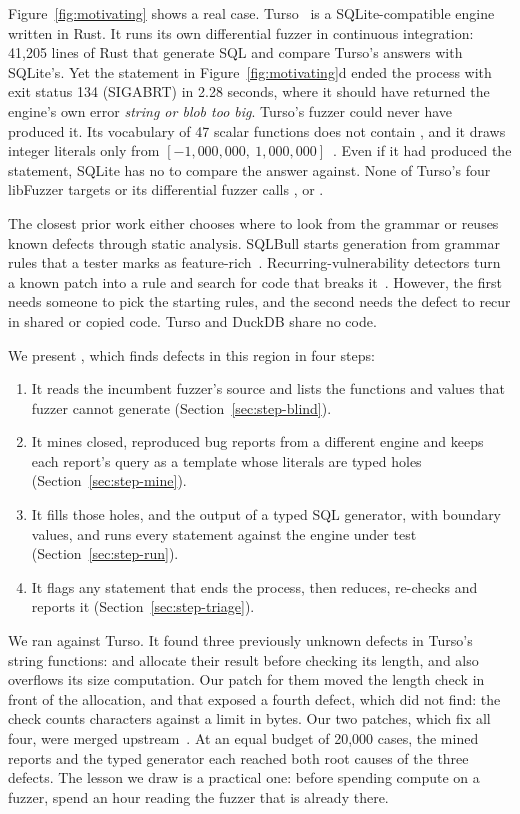 Figure~\ref{fig:motivating} shows a real case. Turso~\cite{turso} is a
SQLite-compatible engine written in Rust. It runs its own differential fuzzer in
continuous integration: 41{,}205 lines of Rust that generate SQL and compare
Turso's answers with SQLite's. Yet the statement in Figure~\ref{fig:motivating}d
ended the process with exit status 134 (SIGABRT) in 2.28 seconds, where it should
have returned the engine's own error \emph{string or blob too big}. Turso's
fuzzer could never have produced it. Its vocabulary of 47 scalar functions does
not contain , and it draws integer literals only from
$[-1{,}000{,}000,\ 1{,}000{,}000]$~\cite{tursofuzzer}. Even if it had produced
the statement, SQLite has no  to compare the answer against. None of
Turso's four libFuzzer targets or its differential fuzzer calls ,
 or .

The closest prior work either chooses where to look from the grammar or reuses
known defects through static analysis. SQLBull starts generation from grammar
rules that a tester marks as feature-rich~\cite{liang2026sqlbull}.
Recurring-vulnerability detectors turn a known patch into a rule and search for
code that breaks it~\cite{cao2025vulpa,cao2025antman}. However, the first needs
someone to pick the starting rules, and the second needs the defect to recur in
shared or copied code. Turso and DuckDB share no code.

We present \tool, which finds defects in this region in four steps:
\begin{enumerate}
  \item It reads the incumbent fuzzer's source and lists the functions and
        values that fuzzer cannot generate (Section~\ref{sec:step-blind}).
  \item It mines closed, reproduced bug reports from a different engine and keeps
        each report's query as a template whose literals are typed holes
        (Section~\ref{sec:step-mine}).
  \item It fills those holes, and the output of a typed SQL generator, with
        boundary values, and runs every statement against the engine under test
        (Section~\ref{sec:step-run}).
  \item It flags any statement that ends the process, then reduces, re-checks and
        reports it (Section~\ref{sec:step-triage}).
\end{enumerate}

We ran \tool against Turso. It found three previously unknown defects in Turso's
string functions:  and  allocate their result before checking
its length, and  also overflows its size computation. Our patch for
them moved the length check in front of the allocation, and that exposed a
fourth defect, which \tool did not find: the check counts characters against a
limit in bytes. Our two patches, which fix all four, were merged
upstream~\cite{turso11225,turso11259}. At an equal budget of 20{,}000 cases, the
mined reports and the typed generator each reached both root causes of the
three defects. The lesson we draw is a practical one: before spending compute on
a fuzzer, spend an hour reading the fuzzer that is already there.

